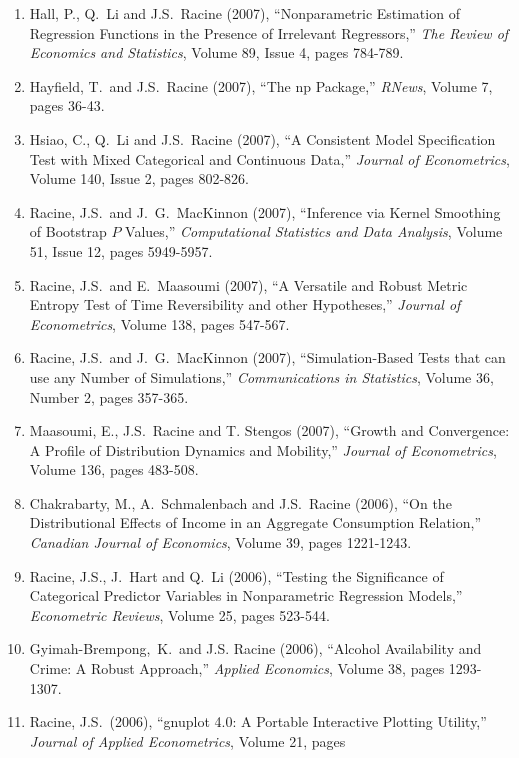 \documentclass[
]{article}
\begin{document}
\begin{enumerate}
  Racine, J.S.~(2008), ``Nonparametric Econometrics: A Primer,''
  \emph{Quantile}, Number 4, pages 7-56.
\item
  Hall, P., Q.~Li and J.S.~Racine (2007), ``Nonparametric Estimation of
  Regression Functions in the Presence of Irrelevant Regressors,''
  \emph{The Review of Economics and Statistics}, Volume 89, Issue 4,
  pages 784-789.
\item
  Hayfield, T.~and J.S.~Racine (2007), ``The np Package,'' \emph{RNews},
  Volume 7, pages 36-43.
\item
  Hsiao, C., Q.~Li and J.S.~Racine (2007), ``A Consistent Model
  Specification Test with Mixed Categorical and Continuous Data,''
  \emph{Journal of Econometrics}, Volume 140, Issue 2, pages 802-826.
\item
  Racine, J.S.~and J.~G.~MacKinnon (2007), ``Inference via Kernel
  Smoothing of Bootstrap \(P\) Values,'' \emph{Computational Statistics
  and Data Analysis}, Volume 51, Issue 12, pages 5949-5957.
\item
  Racine, J.S.~and E.~Maasoumi (2007), ``A Versatile and Robust Metric
  Entropy Test of Time Reversibility and other Hypotheses,''
  \emph{Journal of Econometrics}, Volume 138, pages 547-567.
\item
  Racine, J.S.~and J.~G.~MacKinnon (2007), ``Simulation-Based Tests that
  can use any Number of Simulations,'' \emph{Communications in
  Statistics}, Volume 36, Number 2, pages 357-365.
\item
  Maasoumi, E., J.S.~Racine and T. Stengos (2007), ``Growth and
  Convergence: A Profile of Distribution Dynamics and Mobility,''
  \emph{Journal of Econometrics}, Volume 136, pages 483-508.
\item
  Chakrabarty, M., A.~Schmalenbach and J.S.~Racine (2006), ``On the
  Distributional Effects of Income in an Aggregate Consumption
  Relation,'' \emph{Canadian Journal of Economics}, Volume 39, pages
  1221-1243.
\item
  Racine, J.S., J.~Hart and Q.~Li (2006), ``Testing the Significance of
  Categorical Predictor Variables in Nonparametric Regression Models,''
  \emph{Econometric Reviews}, Volume 25, pages 523-544.
\item
  Gyimah-Brempong,~K.~and J.S. Racine (2006), ``Alcohol Availability and
  Crime: A Robust Approach,'' \emph{Applied Economics}, Volume 38, pages
  1293-1307.
\item
  Racine, J.S.~(2006), ``gnuplot 4.0: A Portable Interactive Plotting
  Utility,'' \emph{Journal of Applied Econometrics}, Volume 21, pages

\end{enumerate}
\end{document}
